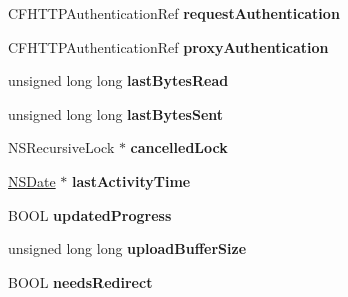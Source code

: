 \begin{DoxyCompactItemize}
\item 
\hypertarget{interface_a_s_i_h_t_t_p_request_af38049645f3c56d1750ecb6cbc608bb2}{
\-C\-F\-H\-T\-T\-P\-Authentication\-Ref {\bfseries request\-Authentication}}
\label{interface_a_s_i_h_t_t_p_request_af38049645f3c56d1750ecb6cbc608bb2}

\item 
\hypertarget{interface_a_s_i_h_t_t_p_request_aec0b048cf5c5fa2c8ad817d54f9b17ab}{
\-C\-F\-H\-T\-T\-P\-Authentication\-Ref {\bfseries proxy\-Authentication}}
\label{interface_a_s_i_h_t_t_p_request_aec0b048cf5c5fa2c8ad817d54f9b17ab}

\item 
\hypertarget{interface_a_s_i_h_t_t_p_request_a2a8e22b7d7e6a869a38d97fa038bef9a}{
unsigned long long {\bfseries last\-Bytes\-Read}}
\label{interface_a_s_i_h_t_t_p_request_a2a8e22b7d7e6a869a38d97fa038bef9a}

\item 
\hypertarget{interface_a_s_i_h_t_t_p_request_ad4f78760c1f5fb59653c36fd9c7c209f}{
unsigned long long {\bfseries last\-Bytes\-Sent}}
\label{interface_a_s_i_h_t_t_p_request_ad4f78760c1f5fb59653c36fd9c7c209f}

\item 
\hypertarget{interface_a_s_i_h_t_t_p_request_a829085a33971a503dd51b408684197b9}{
\-N\-S\-Recursive\-Lock $\ast$ {\bfseries cancelled\-Lock}}
\label{interface_a_s_i_h_t_t_p_request_a829085a33971a503dd51b408684197b9}

\item 
\hypertarget{interface_a_s_i_h_t_t_p_request_ac51b9b558daba0a9e27f35c47854f391}{
\hyperlink{class_n_s_date}{\-N\-S\-Date} $\ast$ {\bfseries last\-Activity\-Time}}
\label{interface_a_s_i_h_t_t_p_request_ac51b9b558daba0a9e27f35c47854f391}

\item 
\hypertarget{interface_a_s_i_h_t_t_p_request_a5199e38fc372316461df8ba77e2ecdd4}{
\-B\-O\-O\-L {\bfseries updated\-Progress}}
\label{interface_a_s_i_h_t_t_p_request_a5199e38fc372316461df8ba77e2ecdd4}

\item 
\hypertarget{interface_a_s_i_h_t_t_p_request_ac6abd0e753daedeb792b46ee4eefa277}{
unsigned long long {\bfseries upload\-Buffer\-Size}}
\label{interface_a_s_i_h_t_t_p_request_ac6abd0e753daedeb792b46ee4eefa277}

\item 
\hypertarget{interface_a_s_i_h_t_t_p_request_a3c4574ca8a1373d48160a9715e103b3a}{
\-B\-O\-O\-L {\bfseries needs\-Redirect}}
\label{interface_a_s_i_h_t_t_p_request_a3c4574ca8a1373d48160a9715e103b3a}


\end{DoxyCompactItemize}
